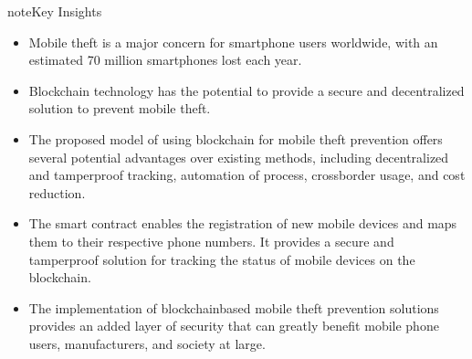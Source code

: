 \documentclass[letterpaper,10pt,english]{jupyterBook}
\begin{document}
\begin{sphinxadmonition}{note}{Key Insights}
\begin{itemize}
\item {} 
\sphinxAtStartPar
Mobile theft is a major concern for smartphone users worldwide, with an estimated 70 million smartphones lost each year.

\item {} 
\sphinxAtStartPar
Blockchain technology has the potential to provide a secure and decentralized solution to prevent mobile theft.

\item {} 
\sphinxAtStartPar
The proposed model of using blockchain for mobile theft prevention offers several potential advantages over existing methods, including decentralized and tamper\sphinxhyphen{}proof tracking, automation of process, cross\sphinxhyphen{}border usage, and cost reduction.

\item {} 
\sphinxAtStartPar
The smart contract enables the registration of new mobile devices and maps them to their respective phone numbers. It provides a secure and tamper\sphinxhyphen{}proof solution for tracking the status of mobile devices on the blockchain.

\item {} 
\sphinxAtStartPar
The implementation of blockchain\sphinxhyphen{}based mobile theft prevention solutions provides an added layer of security that can greatly benefit mobile phone users, manufacturers, and society at large.

\end{itemize}
\end{sphinxadmonition}
\end{document}

